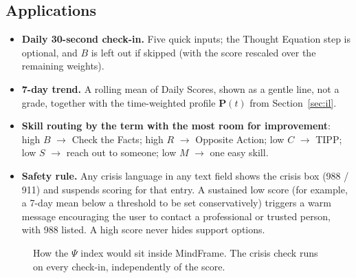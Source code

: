\documentclass[11pt]{article}
\begin{document}
\subsection{Applications}
\begin{itemize}
\item \textbf{Daily 30-second check-in.} Five quick inputs; the Thought Equation step is optional, and $B$ is left out if skipped (with the score rescaled over the remaining weights).
\item \textbf{7-day trend.} A rolling mean of Daily Scores, shown as a gentle line, not a grade, together with the time-weighted profile $\mathbf{P}(t)$ from Section~\ref{sec:il}.
\item \textbf{Skill routing by the term with the most room for improvement}: high $B$ $\to$ Check the Facts; high $R$ $\to$ Opposite Action; low $C$ $\to$ TIPP; low $S$ $\to$ reach out to someone; low $M$ $\to$ one easy skill.
\item \textbf{Safety rule.} Any crisis language in any text field shows the crisis box (988 / 911) and suspends scoring for that entry. A sustained low score (for example, a 7-day mean below a threshold to be set conservatively) triggers a warm message encouraging the user to contact a professional or trusted person, with 988 listed. A high score never hides support options.
\end{itemize}

\begin{figure}[t]
\centering
{}
\caption{How the $\Psi$ index would sit inside MindFrame. The crisis check runs on every check-in, independently of the score.}
\label{fig:psi}
\end{figure}
\end{document}
